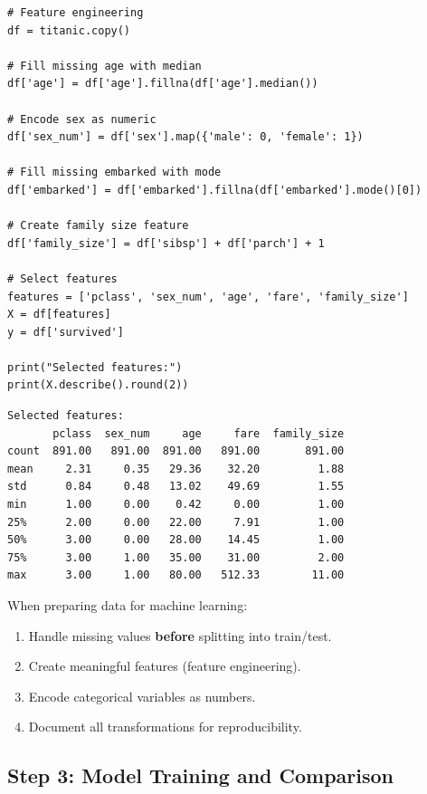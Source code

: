 \begin{codeblock}[title=\textbf{Python}]
\begin{verbatim}
# Feature engineering
df = titanic.copy()

# Fill missing age with median
df['age'] = df['age'].fillna(df['age'].median())

# Encode sex as numeric
df['sex_num'] = df['sex'].map({'male': 0, 'female': 1})

# Fill missing embarked with mode
df['embarked'] = df['embarked'].fillna(df['embarked'].mode()[0])

# Create family size feature
df['family_size'] = df['sibsp'] + df['parch'] + 1

# Select features
features = ['pclass', 'sex_num', 'age', 'fare', 'family_size']
X = df[features]
y = df['survived']

print("Selected features:")
print(X.describe().round(2))
\end{verbatim}
\end{codeblock}

\begin{codeoutput}
\begin{verbatim}
Selected features:
       pclass  sex_num     age     fare  family_size
count  891.00   891.00  891.00   891.00       891.00
mean     2.31     0.35   29.36    32.20         1.88
std      0.84     0.48   13.02    49.69         1.55
min      1.00     0.00    0.42     0.00         1.00
25%      2.00     0.00   22.00     7.91         1.00
50%      3.00     0.00   28.00    14.45         1.00
75%      3.00     1.00   35.00    31.00         2.00
max      3.00     1.00   80.00   512.33        11.00
\end{verbatim}
\end{codeoutput}

\begin{bestpractice}
When preparing data for machine learning:
\begin{enumerate}
    \item Handle missing values \textbf{before} splitting into train/test.
    \item Create meaningful features (feature engineering).
    \item Encode categorical variables as numbers.
    \item Document all transformations for reproducibility.
\end{enumerate}
\end{bestpractice}

\subsection{Step 3: Model Training and Comparison}

